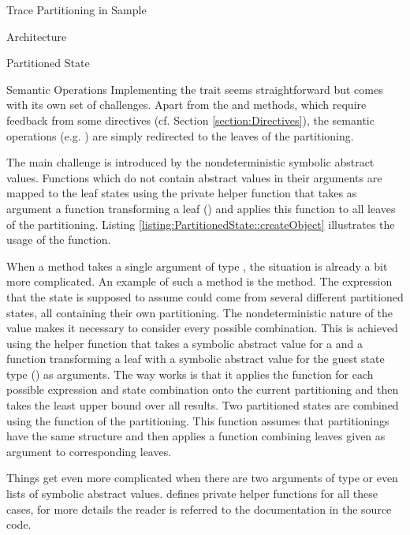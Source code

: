 \begin{chapter}{Trace Partitioning in Sample}
\begin{section}{Architecture}
\begin{subsection}{Partitioned State}

			\begin{subsubsection}{Semantic Operations}
				Implementing the  trait seems straightforward but comes with its own set of challenges. Apart from the  and  methods, which require feedback from some directives (cf. Section \ref{section:Directives}), the semantic operations (e.g. ) are simply redirected to the leaves of the partitioning.

				The main challenge is introduced by the nondeterministic symbolic abstract values. Functions which do not contain abstract values in their arguments are mapped to the leaf states using the private helper function  that takes as argument a function transforming a leaf () and applies this function to all leaves of the partitioning. Listing \ref{listing:PartitionedState::createObject} illustrates the usage of the  function.

				

				When a method takes a single argument of type , the situation is already a bit more complicated. An example of such a method is the  method. The expression that the state is supposed to assume could come from several different partitioned states, all containing their own partitioning. The nondeterministic nature of the value makes it necessary to consider every possible combination. This is achieved using the helper function  that takes a symbolic abstract value for a  and a function transforming a leaf with a symbolic abstract value for the guest state type () as arguments. The way  works is that it applies the function for each possible expression and state combination onto the current partitioning and then takes the least upper bound over all results. Two partitioned states are combined using the  function of the partitioning. This function assumes that partitionings have the same structure and then applies a function combining leaves given as argument to corresponding leaves.

				Things get even more complicated when there are two arguments of type  or even lists of symbolic abstract values.  defines private helper functions for all these cases, for more details the reader is referred to the documentation in the source code.\\
			\end{subsubsection}


\end{subsection}
\end{section}
\end{chapter}

